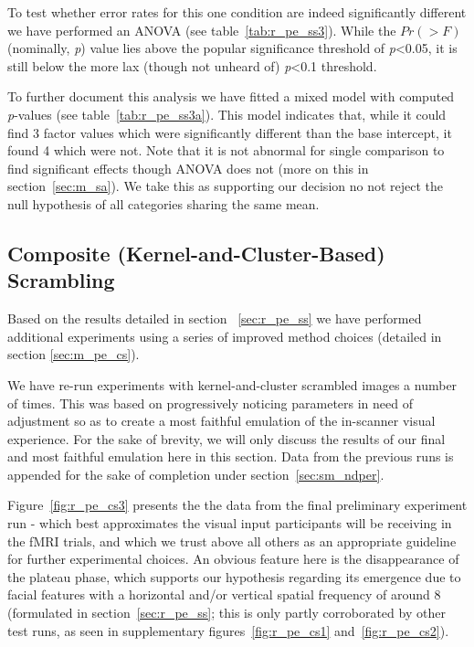 	    To test whether error rates for this one condition are indeed significantly different we have performed an ANOVA (see table~\ref{tab:r_pe_ss3}).
	    While the $Pr(>F)$ (nominally, \textit{p}) value lies above the popular significance threshold of \textit{p}<0.05, 
	    it is still below the more lax (though not unheard of) \textit{p}<0.1 threshold.
	    
	    To further document this analysis we have fitted a mixed model with computed \textit{p}-values (see table~\ref{tab:r_pe_ss3a}).
	    This model indicates that, while it could find 3 factor values which were significantly different than the base intercept, it found 4 which were not.
	    Note that it is not abnormal for single comparison to find significant effects though ANOVA does not (more on this in section~\ref{sec:m_sa}).
	    We take this as supporting our decision no not reject the null hypothesis of all categories sharing the same mean.
	\subsection{Composite (Kernel-and-Cluster-Based) Scrambling}\label{sec:pe_r_cs}
	    Based on the results detailed in section ~\ref{sec:r_pe_ss} we have performed additional experiments using a series of improved method choices (detailed in section \ref{sec:m_pe_cs}).
	    
	    We have re-run experiments with kernel-and-cluster scrambled images a number of times.
	    This was based on progressively noticing parameters in need of adjustment so as to create a most faithful emulation of the in-scanner visual experience.
	    For the sake of brevity, we will only discuss the results of our final and most faithful emulation here in this section.
	    Data from the previous runs is appended for the sake of completion under section~\ref{sec:sm_ndper}.
	     
	    
	    Figure~\ref{fig:r_pe_cs3} presents the the data from the final preliminary experiment run - which best approximates the visual input participants will be receiving in the fMRI trials, and which we trust above all others as an appropriate guideline for further experimental choices.
	    An obvious feature here is the disappearance of the plateau phase, which supports our hypothesis regarding its emergence due to facial features with a horizontal and/or vertical spatial frequency of around \SI{8}{\pixel} (formulated in section~\ref{sec:r_pe_ss}; this is only partly corroborated by other test runs, as seen in supplementary figures~\ref{fig:r_pe_cs1} and~\ref{fig:r_pe_cs2}).
	    
